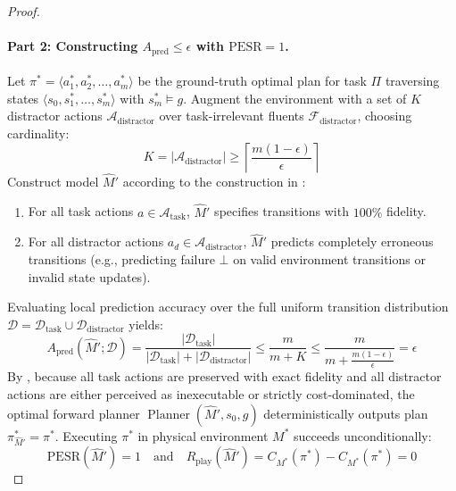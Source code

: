 \documentclass[11pt,a4paper]{article}
\theoremstyle{definition}
\theoremstyle{remark}
\begin{document}
\begin{proof}
\paragraph{Part 2: Constructing $A_{\text{pred}} \le \epsilon$ with $\text{PESR} = 1$.}
Let $\pi^* = \langle a_1^*, a_2^*, \dots, a_m^* \rangle$ be the ground-truth optimal plan for task $\Pi$ traversing states $\langle s_0, s_1^*, \dots, s_m^* \rangle$ with $s_m^* \models g$.
Augment the environment with a set of $K$ distractor actions $\mathcal{A}_{\text{distractor}}$ over task-irrelevant fluents $\mathcal{F}_{\text{distractor}}$, choosing cardinality:
\begin{equation}
    K = |\mathcal{A}_{\text{distractor}}| \ge \left\lceil \frac{m(1 - \epsilon)}{\epsilon} \right\rceil
\end{equation}
Construct model $\widehat{M}'$ according to the construction in :
\begin{enumerate}
    \item For all task actions $a \in \mathcal{A}_{\text{task}}$, $\widehat{M}'$ specifies transitions with $100\%$ fidelity.
    \item For all distractor actions $a_d \in \mathcal{A}_{\text{distractor}}$, $\widehat{M}'$ predicts completely erroneous transitions (e.g., predicting failure $\bot$ on valid environment transitions or invalid state updates).
\end{enumerate}
Evaluating local prediction accuracy over the full uniform transition distribution $\mathcal{D} = \mathcal{D}_{\text{task}} \cup \mathcal{D}_{\text{distractor}}$ yields:
\begin{equation}
    A_{\text{pred}}(\widehat{M}'; \mathcal{D}) = \frac{|\mathcal{D}_{\text{task}}|}{|\mathcal{D}_{\text{task}}| + |\mathcal{D}_{\text{distractor}}|} \le \frac{m}{m + K} \le \frac{m}{m + \frac{m(1-\epsilon)}{\epsilon}} = \epsilon
\end{equation}
By , because all task actions are preserved with exact fidelity and all distractor actions are either perceived as inexecutable or strictly cost-dominated, the optimal forward planner $\operatorname{Planner}(\widehat{M}', s_0, g)$ deterministically outputs plan $\pi^*_{\widehat{M}'} = \pi^*$.
Executing $\pi^*$ in physical environment $M^*$ succeeds unconditionally:
\begin{equation}
    \text{PESR}(\widehat{M}') = 1 \quad \text{and} \quad R_{\text{play}}(\widehat{M}') = C_{M^*}(\pi^*) - C_{M^*}(\pi^*) = 0
\end{equation}


\end{proof}
\end{document}
